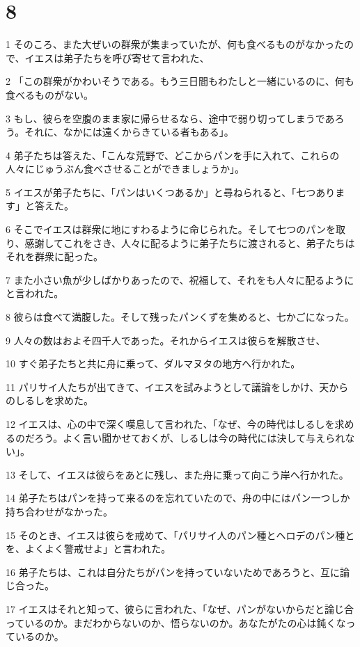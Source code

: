 \chapter{8}

\par 1 そのころ、また大ぜいの群衆が集まっていたが、何も食べるものがなかったので、イエスは弟子たちを呼び寄せて言われた、
\par 2 「この群衆がかわいそうである。もう三日間もわたしと一緒にいるのに、何も食べるものがない。
\par 3 もし、彼らを空腹のまま家に帰らせるなら、途中で弱り切ってしまうであろう。それに、なかには遠くからきている者もある」。
\par 4 弟子たちは答えた、「こんな荒野で、どこからパンを手に入れて、これらの人々にじゅうぶん食べさせることができましょうか」。
\par 5 イエスが弟子たちに、「パンはいくつあるか」と尋ねられると、「七つあります」と答えた。
\par 6 そこでイエスは群衆に地にすわるように命じられた。そして七つのパンを取り、感謝してこれをさき、人々に配るように弟子たちに渡されると、弟子たちはそれを群衆に配った。
\par 7 また小さい魚が少しばかりあったので、祝福して、それをも人々に配るようにと言われた。
\par 8 彼らは食べて満腹した。そして残ったパンくずを集めると、七かごになった。
\par 9 人々の数はおよそ四千人であった。それからイエスは彼らを解散させ、
\par 10 すぐ弟子たちと共に舟に乗って、ダルマヌタの地方へ行かれた。
\par 11 パリサイ人たちが出てきて、イエスを試みようとして議論をしかけ、天からのしるしを求めた。
\par 12 イエスは、心の中で深く嘆息して言われた、「なぜ、今の時代はしるしを求めるのだろう。よく言い聞かせておくが、しるしは今の時代には決して与えられない」。
\par 13 そして、イエスは彼らをあとに残し、また舟に乗って向こう岸へ行かれた。
\par 14 弟子たちはパンを持って来るのを忘れていたので、舟の中にはパン一つしか持ち合わせがなかった。
\par 15 そのとき、イエスは彼らを戒めて、「パリサイ人のパン種とヘロデのパン種とを、よくよく警戒せよ」と言われた。
\par 16 弟子たちは、これは自分たちがパンを持っていないためであろうと、互に論じ合った。
\par 17 イエスはそれと知って、彼らに言われた、「なぜ、パンがないからだと論じ合っているのか。まだわからないのか、悟らないのか。あなたがたの心は鈍くなっているのか。

